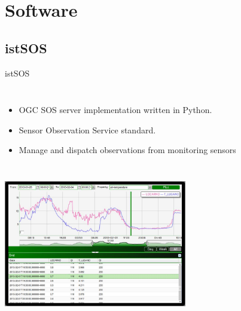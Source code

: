 \documentclass[xcolor=dvipsnames,beamer]{beamer} %
\begin{document}
\section{Software}
\subsection{istSOS}
\begin{frame}[fragile]{istSOS}

\begin{columns}
 \begin{itemize}
  \item OGC SOS server implementation written in Python.
  \item Sensor Observation Service standard.
  \item Manage and dispatch observations from monitoring sensors
 \end{itemize}
 
\end{columns}

\begin{flushright}
  \includegraphics[width=8cm]{istsos3}
\end{flushright}



\end{frame}
\end{document}
